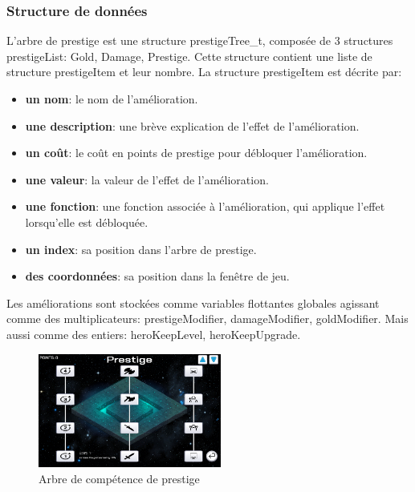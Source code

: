 \documentclass[11pt,a4paper]{article}
\begin{document}
\subsubsection{Structure de données}
L’arbre de prestige est une structure prestigeTree\_t, composée de 3 structures prestigeList: Gold, Damage, Prestige. Cette structure contient une liste de structure prestigeItem et leur nombre.
La structure prestigeItem est décrite par:
\begin{itemize}
    \item \textbf{un nom}: le nom de l'amélioration.
    \item \textbf{une description}: une brève explication de l'effet de l'amélioration.
    \item \textbf{un coût}: le coût en points de prestige pour débloquer l'amélioration.
    \item \textbf{une valeur}: la valeur de l'effet de l'amélioration.
    \item \textbf{une fonction}: une fonction associée à l'amélioration, qui applique l'effet lorsqu'elle est débloquée.
    \item \textbf{un index}: sa position dans l'arbre de prestige.
    \item \textbf{des coordonnées}: sa position dans la fenêtre de jeu.
\end{itemize}
Les améliorations sont stockées comme variables flottantes globales agissant comme des multiplicateurs: prestigeModifier, damageModifier, goldModifier. Mais aussi comme des entiers: heroKeepLevel, heroKeepUpgrade.
\begin{figure}[h] 
    \centering 
    \includegraphics[width=6cm]{img/prestige_image.png} 
    \caption{Arbre de compétence de prestige}
    \label{Arbre de compétence de prestige}
\end{figure}
\end{document}
